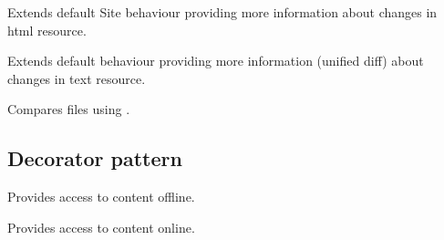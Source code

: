 \documentclass[letterpaper,10pt,english]{sphinxmanual}
\begin{document}

\begin{fulllineitems}
\label{index:spy.HTMLSite}
Extends default Site behaviour providing more information
about changes in html resource.

\end{fulllineitems}


\begin{fulllineitems}
\label{index:spy.TextSite}
Extends default  behaviour providing more information (unified diff)
about changes in text resource.

\begin{fulllineitems}
\label{index:spy.TextSite.compare}
Compares files using .

\end{fulllineitems}


\end{fulllineitems}



\subsection{Decorator pattern}
\label{index:decorator-pattern}

\begin{fulllineitems}
\label{index:spy.OfflineSiteDecorator}
Provides access to content offline.

\end{fulllineitems}


\begin{fulllineitems}
\label{index:spy.OnlineSiteDecorator}
Provides access to content online.

\end{fulllineitems}
\end{document}
